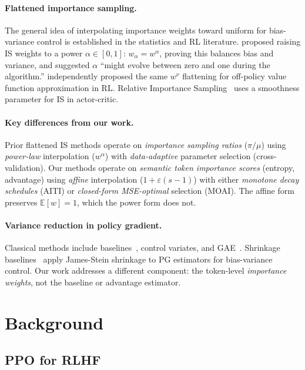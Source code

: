 \documentclass[11pt,a4paper]{article}
\begin{document}
\paragraph{Flattened importance sampling.}
The general idea of interpolating importance weights toward uniform for bias-variance control is established in the statistics and RL literature. \citet{korba2022adaptive} proposed raising IS weights to a power $\alpha \in [0,1]$: $w_\alpha = w^\alpha$, proving this balances bias and variance, and suggested $\alpha$ ``might evolve between zero and one during the algorithm.'' \citet{hachiya2009adaptive} independently proposed the same $w^\nu$ flattening for off-policy value function approximation in RL. Relative Importance Sampling~\citep{ris2025} uses a smoothness parameter for IS in actor-critic.

\paragraph{Key differences from our work.}
Prior flattened IS methods operate on \emph{importance sampling ratios} ($\pi / \mu$) using \emph{power-law} interpolation ($w^\alpha$) with \emph{data-adaptive} parameter selection (cross-validation). Our methods operate on \emph{semantic token importance scores} (entropy, advantage) using \emph{affine} interpolation ($1 + \varepsilon(s{-}1)$) with either \emph{monotone decay schedules} (AITI) or \emph{closed-form MSE-optimal} selection (MOAI). The affine form preserves $\mathbb{E}[w] = 1$, which the power form does not.

\paragraph{Variance reduction in policy gradient.}
Classical methods include baselines~\citep{williams1992simple}, control variates, and GAE~\citep{schulman2016gae}. Shrinkage baselines~\citep{shrinkage2025} apply James-Stein shrinkage to PG estimators for bias-variance control. Our work addresses a different component: the token-level \emph{importance weights}, not the baseline or advantage estimator.

\section{Background}
\label{sec:background}

\subsection{PPO for RLHF}
\end{document}
